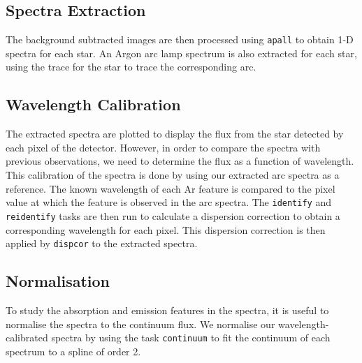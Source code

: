 
\subsection{Spectra Extraction}\label{cha:InfraredDataReductionTechniques:sec:SpectroscopyData:subsec:SpectraExtraction}

The background subtracted images are then processed using
\texttt{apall} to obtain 1-D spectra for each star. An Argon arc lamp spectrum is also extracted for
each star, using the trace for the star to trace the corresponding arc. %


\subsection{Wavelength Calibration}\label{cha:InfraredDataReductionTechniques:sec:SpectroscopyData:subsec:WavelengthCalibration}

The extracted spectra are plotted to display the flux from the star
detected by each pixel of the detector. However, in order to compare
the spectra with previous observations, we need to determine the
flux as a function of wavelength. This calibration of the spectra is
done by using our extracted arc spectra as a reference. The known
wavelength of each Ar feature is compared to the pixel value at which
the feature is observed in the arc spectra. The \texttt{identify} and \texttt{reidentify} tasks are
then run to calculate a dispersion correction to obtain a
corresponding wavelength for each pixel. This dispersion correction is then applied by \texttt{dispcor} to the extracted spectra. %


\subsection{Normalisation}\label{cha:InfraredDataReductionTechniques:sec:SpectroscopyData:subsec:Normalisation}

To study the absorption and emission features in the spectra, it is useful to normalise the spectra to the continuum flux. We normalise our
wavelength-calibrated spectra by using the task \texttt{continuum} to
fit the continuum of each spectrum to a spline of order 2. %



